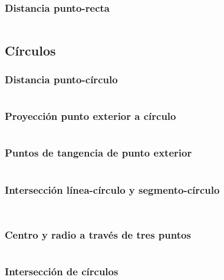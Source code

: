 \documentclass[11pt]{article}
\begin{document}
			\subsubsection{Distancia punto-recta}
			\inputminted[tabsize=2,breaklines,firstline=169,lastline=172,fontsize=\small]{c++}{geometry.cpp}
			
		\subsection{Círculos}
			\subsubsection{Distancia punto-círculo}
			\inputminted[tabsize=2,breaklines,firstline=391,lastline=394,fontsize=\small]{c++}{geometry.cpp}
			
			\subsubsection{Proyección punto exterior a círculo}
			\inputminted[tabsize=2,breaklines,firstline=396,lastline=399,fontsize=\small]{c++}{geometry.cpp}
			
			\subsubsection{Puntos de tangencia de punto exterior}
			\inputminted[tabsize=2,breaklines,firstline=401,lastline=406,fontsize=\small]{c++}{geometry.cpp}
			
			\subsubsection{Intersección línea-círculo y segmento-círculo}
			\inputminted[tabsize=2,breaklines,firstline=408,lastline=422,fontsize=\small]{c++}{geometry.cpp}
			\inputminted[tabsize=2,breaklines,firstline=789,lastline=795,fontsize=\small]{c++}{geometry.cpp}
			
			\subsubsection{Centro y radio a través de tres puntos}
			\inputminted[tabsize=2,breaklines,firstline=424,lastline=429,fontsize=\small]{c++}{geometry.cpp}
			
			\subsubsection{Intersección de círculos}
			\inputminted[tabsize=2,breaklines,firstline=431,lastline=448,fontsize=\small]{c++}{geometry.cpp}
			
\end{document}
